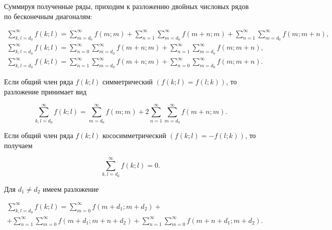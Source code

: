 Суммируя полученные ряды, приходим к разложению двойных числовых рядов по бесконечным диагоналям:

\begin{gather*}


\sum_{k,l=d_0}^\infty f(k;l)=

\sum_{m=d_0}^\infty f(m;m)+

\sum_{n=1}^\infty\sum_{m=d_0}^\infty f(m+n;m)+

\sum_{n=1}^\infty\sum_{m=d_0}^\infty f(m;m+n),


\\

\sum_{k,l=d_0}^\infty f(k;l)=

\sum_{n=0}^\infty\sum_{m=d_0}^\infty f(m+n;m)+

\sum_{n=1}^\infty\sum_{m=d_0}^\infty f(m;m+n),

\\

\sum_{k,l=d_0}^\infty f(k;l)=

\sum_{n=1}^\infty\sum_{m=d_0}^\infty f(m+n;m)+

\sum_{n=0}^\infty\sum_{m=d_0}^\infty f(m;m+n).

\end{gather*}

Если общий член ряда $f(k;l)$ симметрический $(f(k;l)=f(l;k))$, то разложение принимает вид

$$


\sum_{k,l=d_0}^\infty f(k;l)=

\sum_{m=d_0}^\infty f(m;m)+

2\sum_{n=1}^\infty\sum_{m=d_0}^\infty f(m+n;m).


$$

Если общий член ряда $f(k;l)$ кососимметрический $(f(k;l)=-f(l;k))$, то получаем

$$


\sum_{k,l=d_0}^\infty f(k;l)=0.


$$



Для $d_1\ne d_2$ имеем разложение

\begin{multline*}

\sum_{k,l=d_0}^\infty f(k;l)=

\sum_{m=0}^\infty f(m+d_1;m+d_2)+\\

+\sum_{n=1}^\infty\sum_{m=0}^\infty f(m+d_1;m+n+d_2)+

\sum_{n=1}^\infty\sum_{m=0}^\infty f(m+n+d_1;m+d_2).

\end{multline*}



